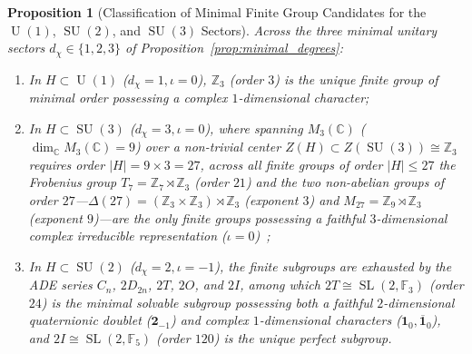 \documentclass[11pt,a4paper]{article}
\newtheorem{proposition}[theorem]{Proposition}
\theoremstyle{definition}
\theoremstyle{remark}
\newcommand{\C}{\mathbb{C}}
\newcommand{\Z}{\mathbb{Z}}
\newcommand{\F}{\mathbb{F}}
\newcommand{\SU}{\operatorname{SU}}
\newcommand{\U}{\operatorname{U}}
\newcommand{\SL}{\operatorname{SL}}
\begin{document}
\begin{proposition}[Classification of Minimal Finite Group Candidates for the {$\U(1)$}, {$\SU(2)$}, and {$\SU(3)$} Sectors]
\label{prop:minimal_candidates}
Across the three minimal unitary sectors $d_\chi \in \{1, 2, 3\}$ of Proposition~\ref{prop:minimal_degrees}:
\begin{enumerate}
    \item In $H \subset \U(1)$ ($d_\chi = 1, \iota = 0$), $\Z_3$ (order $3$) is the unique finite group of minimal order possessing a complex $1$-dimensional character;
    \item In $H \subset \SU(3)$ ($d_\chi = 3, \iota = 0$), where spanning $M_3(\C)$ ($\dim_{\C} M_3(\C) = 9$) over a non-trivial center $Z(H) \subset Z(\SU(3)) \cong \Z_3$ requires order $|H| = 9 \times 3 = 27$, across all finite groups of order $|H| \le 27$ the Frobenius group $T_7 = \Z_7 \rtimes \Z_3$ (order $21$) and the two non-abelian groups of order $27$---$\Delta(27) = (\Z_3 \times \Z_3) \rtimes \Z_3$ (exponent $3$) and $M_{27} = \Z_9 \rtimes \Z_3$ (exponent $9$)---are the only finite groups possessing a faithful $3$-dimensional complex irreducible representation ($\iota = 0$)~\cite{FairbairnFultonKlink1964};
    \item In $H \subset \SU(2)$ ($d_\chi = 2, \iota = -1$), the finite subgroups are exhausted by the ADE series $C_n$, $2D_{2n}$, $2T$, $2O$, and $2I$, among which $2T \cong \SL(2,\F_3)$ (order $24$) is the minimal solvable subgroup possessing both a faithful $2$-dimensional quaternionic doublet ($\mathbf{2}_{-1}$) and complex $1$-dimensional characters ($\mathbf{1}_0, \overline{\mathbf{1}}_0$), and $2I \cong \SL(2,\F_5)$ (order $120$) is the unique perfect subgroup.
\end{enumerate}
\end{proposition}
\end{document}
